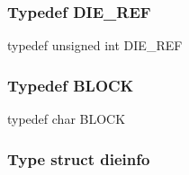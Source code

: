 \subsubsection{Typedef DIE\_REF}
\label{type_DIE_REF_dwarfread.c}

{\stt typedef unsigned int DIE\_REF}


\subsubsection{Typedef BLOCK}
\label{type_BLOCK_dwarfread.c}

{\stt typedef char BLOCK}


\subsubsection{Type struct dieinfo}
\label{type_struct_dieinfo_dwarfread.c}

